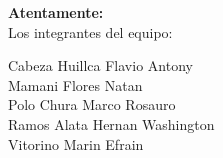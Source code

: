 \begin{presentacion}
\begin{flushright}
\textbf{Atentamente:} \\[0.4cm]
Los integrantes del equipo:
\end{flushright}

\vspace{0.5cm}

\begin{flushright}
Cabeza Huillca Flavio Antony \\
Mamani Flores Natan \\
Polo Chura Marco Rosauro \\
Ramos Alata Hernan Washington \\
Vitorino Marin Efrain
\end{flushright}

\end{presentacion}